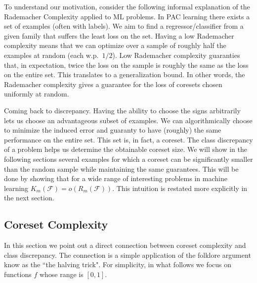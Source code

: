 \documentclass[anon,12pt]{colt2019} %
\newcommand{\F}{\mathcal{F}}
\begin{document}
To understand our motivation, consider the following informal explanation of the Rademacher Complexity applied to ML problems. 
In PAC learning there exists a set of examples (often with labels).
We aim to find a regressor/classifier from a given family that suffers the least loss on the set. 
Having a low Rademacher complexity means that we can optimize over a sample of roughly half the examples at random (each w.p.\ $1/2$).
Low Rademacher complexity guaranties that, in expectation, twice the loss on the sample is roughly the same as the loss on the entire set.
This translates to a generalization bound. 
In other words, the Rademacher complexity gives a guarantee for the loss of coresets chosen uniformly at random.

Coming back to discrepancy. Having the ability to choose the signs arbitrarily lets us choose an advantageous subset of examples.
We can algorithmically choose to minimize the induced error and guaranty to have (roughly) the same performance on the entire set. 
This set is, in fact, a coreset. The class discrepancy of a problem helps us determine the obtainable coreset size. 
We will show in the following sections several examples for which a coreset can be significantly smaller than the random sample while maintaining the same guarantees. This will be done by showing that for a wide range of interesting problems in machine learning $K_m(\F) = o(R_m(\F))$.
This intuition is restated more explicitly in the next section.

\subsection{Coreset Complexity}
In this section we point out a direct connection between coreset complexity and class discrepancy.
The connection is a simple application of the folklore argument know as the ``the halving trick".
For simplicity, in what follows we focus on functions $f$ whose range is $[0,1]$.
\end{document}
